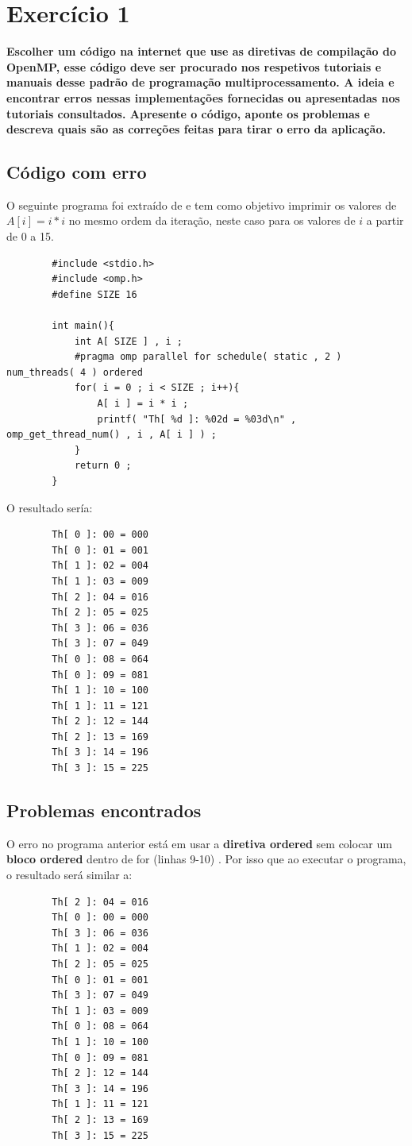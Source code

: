 \documentclass[a4paper,12pt,fleqn]{article}
\begin{document}
\section{Exercício 1} 
\textbf{Escolher um código na internet que use as diretivas de compilação do OpenMP, esse código deve ser procurado nos respetivos tutoriais e manuais desse padrão de programação multiprocessamento. A ideia e encontrar erros nessas implementações fornecidas ou apresentadas nos tutoriais consultados. Apresente o código, aponte os problemas e descreva quais são as correções feitas para tirar o erro da aplicação.} 
 
\subsection{Código com erro} 
	O seguinte programa foi extraído de \cite{Rogerio15} e tem como objetivo imprimir os valores de $A[ i ] = i * i$ no mesmo ordem da iteração, neste caso para os valores de $i$ a partir de 0 a 15.

	\begin{lstlisting} 
		#include <stdio.h>
		#include <omp.h>
		#define SIZE 16

		int main(){
			int A[ SIZE ] , i ;
			#pragma omp parallel for schedule( static , 2 ) num_threads( 4 ) ordered
			for( i = 0 ; i < SIZE ; i++){
				A[ i ] = i * i ;
				printf( "Th[ %d ]: %02d = %03d\n" , omp_get_thread_num() , i , A[ i ] ) ;
			}
			return 0 ;
		}
	\end{lstlisting}
	
	O resultado sería:
	\begin{verbatim}
		Th[ 0 ]: 00 = 000
		Th[ 0 ]: 01 = 001
		Th[ 1 ]: 02 = 004
		Th[ 1 ]: 03 = 009
		Th[ 2 ]: 04 = 016
		Th[ 2 ]: 05 = 025
		Th[ 3 ]: 06 = 036
		Th[ 3 ]: 07 = 049
		Th[ 0 ]: 08 = 064
		Th[ 0 ]: 09 = 081
		Th[ 1 ]: 10 = 100
		Th[ 1 ]: 11 = 121
		Th[ 2 ]: 12 = 144
		Th[ 2 ]: 13 = 169
		Th[ 3 ]: 14 = 196
		Th[ 3 ]: 15 = 225
	\end{verbatim}
 
 \subsection{Problemas encontrados} 
 	O erro no programa anterior está em usar a \textbf{diretiva  ordered} sem colocar um \textbf{bloco ordered} dentro de for (linhas 9-10) \cite{Lawrence14}. Por isso que ao executar o programa, o resultado será similar a:
	\begin{verbatim} 
		Th[ 2 ]: 04 = 016
		Th[ 0 ]: 00 = 000
		Th[ 3 ]: 06 = 036
		Th[ 1 ]: 02 = 004
		Th[ 2 ]: 05 = 025
		Th[ 0 ]: 01 = 001
		Th[ 3 ]: 07 = 049
		Th[ 1 ]: 03 = 009
		Th[ 0 ]: 08 = 064
		Th[ 1 ]: 10 = 100
		Th[ 0 ]: 09 = 081
		Th[ 2 ]: 12 = 144
		Th[ 3 ]: 14 = 196
		Th[ 1 ]: 11 = 121
		Th[ 2 ]: 13 = 169
		Th[ 3 ]: 15 = 225
	\end{verbatim}
\end{document}

